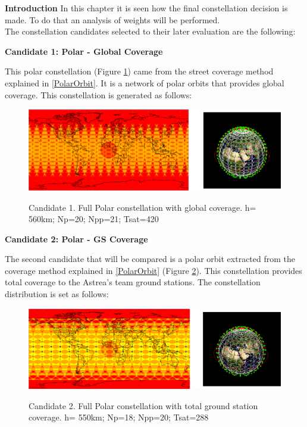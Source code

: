 \textbf{Introduction} 
In this chapter it is seen how the final constellation decision is made. To do that an analysis of weights will be performed.\\

The constellation candidates selected to their later evaluation are the following:

\textbf{Candidate 1: Polar - Global Coverage}

This polar constellation (Figure \ref{fig:Candidate1}) came from the street coverage method explained in \ref{PolarOrbit}. It is a network of polar orbits that provides global coverage. This constellation is generated as follows:

\begin{figure}%
	\centering
	\includegraphics[width=1\textwidth]{Candidate1.png}\\
	\caption{Candidate 1. Full Polar constellation with global coverage.
			 h= 560km; Np=20; Npp=21; Tsat=420 }
	\label{fig:Candidate1}
\end{figure}


\textbf{Candidate 2: Polar - GS Coverage}
 
The second candidate that will be compared is a polar orbit extracted from the coverage method explained in \ref{PolarOrbit} (Figure \ref{fig:Candidate2}). This constellation provides total coverage to the Astrea's team ground stations. The constellation distribution is set as follows:

\begin{figure}%
	\centering
	\includegraphics[width=1\textwidth]{Candidate2.png}\\
	\caption{Candidate 2. Full Polar constellation with total ground station coverage.
			 h= 550km; Np=18; Npp=20; Tsat=288 }
	\label{fig:Candidate2}
\end{figure}


